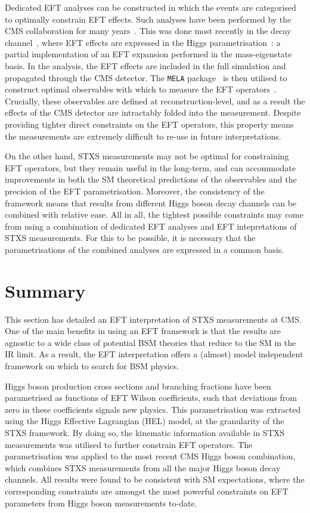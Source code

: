 Dedicated EFT analyses can be constructed in which the events are categorised to optimally constrain EFT effects. Such analyses have been performed by the CMS collaboration for many years~\cite{}. This was done most recently in the \Hfl decay channel~\cite{}, where EFT effects are expressed in the Higgs parametrisation~\cite{}: a partial implementation of an EFT expansion performed in the mass-eigenstate basis. In the analysis, the EFT effects are included in the full simulation and propagated through the CMS detector. The \texttt{MELA} package~\cite{} is then utilised to construct optimal observables with which to measure the EFT operators~\cite{}. Crucially, these observables are defined at reconstruction-level, and as a result the effects of the CMS detector are intractably folded into the measurement. Despite providing tighter direct constraints on the EFT operators, this property means the measurements are extremely difficult to re-use in future interpretations.

On the other hand, STXS measurements may not be optimal for constraining EFT operators, but they remain useful in the long-term, and can accommodate improvements in both the SM theoretical predictions of the observables and the precision of the EFT parametrisation. Moreover, the consistency of the framework means that results from different Higgs boson decay channels can be combined with relative ease. All in all, the tightest possible constraints may come from using a combination of dedicated EFT analyses and EFT intepretations of STXS measurements. For this to be possible, it is necessary that the parametrisations of the combined analyses are expressed in a common basis. 

\section{Summary}
This section has detailed an EFT interpretation of STXS measurements at CMS. One of the main benefits in using an EFT framework is that the results are agnostic to a wide class of potential BSM theories that reduce to the SM in the IR limit. As a result, the EFT interpretation offers a (almost) model independent framework on which to search for BSM physics. 

Higgs boson production cross sections and branching fractions have been parametrised as functions of EFT Wilson coefficients, such that deviations from zero in these coefficients signals new physics. This parametrisation was extracted using the Higgs Effective Lagrangian (HEL) model, at the granularity of the STXS framework. By doing so, the kinematic information available in STXS measurements was utilised to further constrain EFT operators. The parametrisation was applied to the most recent CMS Higgs boson combination, which combines STXS measurements from all the major Higgs boson decay channels. All results were found to be consistent with SM expectations, where the corresponding constraints are amongst the most powerful constraints on EFT parameters from Higgs boson measurements to-date. 

